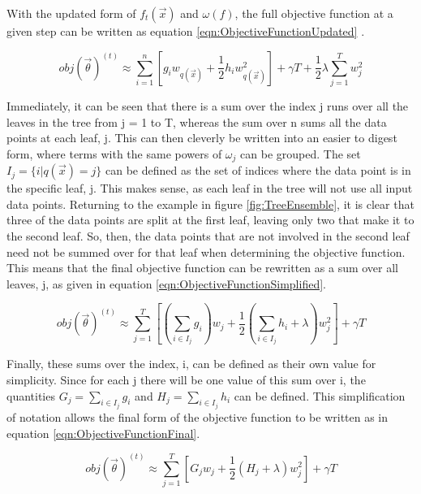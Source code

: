 \documentclass[12pt]{ucsddissertation}
\begin{document}
With the updated form of $f_t(\vec{x})$ and $\omega(f)$, the full objective function at a given step can be written as equation \ref{eqn:ObjectiveFunctionUpdated} \cite{XGBoostPaper}.

\begin{equation}\label{eqn:ObjectiveFunctionUpdated}
	obj(\vec{\theta})^{(t)} \approx \sum_{i=1}^{n}[g_i w_{q(\vec{x})} + \frac{1}{2}h_i w^2_{q(\vec{x})}] + \gamma T + \frac{1}{2} \lambda \sum_{j=1}^{T} w^2_j
\end{equation}

Immediately, it can be seen that there is a sum over the index j runs over all the leaves in the tree from j = 1 to T, whereas the sum over n sums all the data points at each leaf, j. This can then cleverly be written into an easier to digest form, where terms with the same powers of $\omega_j$ can be grouped. The set $I_j = \{i | q(\vec{x}) = j\}$ can be defined as the set of indices where the data point is in the specific leaf, j. This makes sense, as each leaf in the tree will not use all input data points. Returning to the example in figure \ref{fig:TreeEnsemble}, it is clear that three of the data points are split at the first leaf, leaving only two that make it to the second leaf. So, then, the data points that are not involved in the second leaf need not be summed over for that leaf when determining the objective function. This means that the final objective function can be rewritten as a sum over all leaves, j, as given in equation \ref{eqn:ObjectiveFunctionSimplified}.

\begin{equation}\label{eqn:ObjectiveFunctionSimplified}
	obj(\vec{\theta})^{(t)} \approx \sum_{j=1}^{T}[(\sum_{i \in I_j} g_i) w_j + \frac{1}{2}(\sum_{i \in I_j} h_i + \lambda) w^2_j] + \gamma T
\end{equation}

Finally, these sums over the index, i, can be defined as their own value for simplicity. Since for each j there will be one value of this sum over i, the quantities $G_j = \sum_{i \in I_j} g_i $ and $H_j = \sum_{i \in I_j} h_i$ can be defined. This simplification of notation allows the final form of the objective function to be written as in equation \ref{eqn:ObjectiveFunctionFinal}.

\begin{equation}\label{eqn:ObjectiveFunctionFinal}
	obj(\vec{\theta})^{(t)} \approx \sum_{j=1}^{T}[G_j w_j + \frac{1}{2}(H_j + \lambda) w^2_j] + \gamma T
\end{equation}
\end{document}
